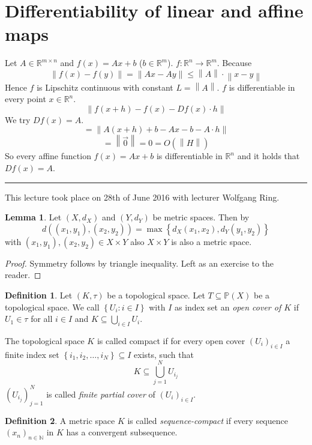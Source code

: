 \documentclass[a4paper,landscape,twocolumn]{article}
\theoremstyle{definition}
\newtheorem{defi}{Definition}
\newtheorem{lemma}{Lemma}
\newcommand\set[1]{\left\{#1\right\}}
\newcommand\meta[3]{\hrule{} This #1 took place on #2 with lecturer #3.\par}
\newcommand\norm[1]{\left\|#1\right\|}
\begin{document}
\section{Differentiability of linear and affine maps}
%
Let $A \in \mathbb R^{m\times n}$ and $f(x) = Ax + b$ ($b \in \mathbb R^m$).
$f: \mathbb R^n \to \mathbb R^m$. Because
\[ \norm{f(x) - f(y)} = \norm{Ax - Ay} \leq \norm{A} \cdot \norm{x - y} \]
Hence $f$ is Lipschitz continuous with constant $L = \norm{A}$.
$f$ is differentiable in every point $x \in \mathbb R^n$.
\[ \norm{f(x+h) - f(x) - Df(x) \cdot h} \]
We try $Df(x) = A$.
\[ = \norm{A (x + h) + b - Ax - b - A \cdot h} \]
\[ = \norm{\vec{0}} = 0 = O(\norm{H}) \]
So every affine function $f(x) = Ax + b$ is differentiable in $\mathbb R^n$
and it holds that $Df(x) = A$.

\meta{lecture}{28th of June 2016}{Wolfgang Ring}
\begin{lemma}
  Let $(X, d_X)$ and $(Y, d_Y)$ be metric spaces. Then by
  \[ d((x_1, y_1), (x_2, y_2)) = \max\set{d_X(x_1, x_2), d_Y(y_1, y_2)} \]
  with $(x_1, y_1), (x_2, y_2) \in X \times Y$ also $X \times Y$ is also
  a metric space.
\end{lemma}
\begin{proof}
  Symmetry follows by triangle inequality.
  Left as an exercise to the reader.
\end{proof}

\begin{defi}
  Let $(K, \tau)$ be a topological space.
  Let $T \subseteq \mathbb{P}(X)$ be a topological space.
  We call $\set{U_i: i \in I}$ with $I$ as index set
  an \emph{open cover of $K$} if $U_1 \in \tau$ for all $i \in I$
  and $K \subseteq \bigcup_{i \in I} U_i$.

  The topological space $K$ is called compact if for every
  open cover $(U_i)_{i \in I}$ a finite index set
  $\set{i_1, i_2, \ldots, i_N} \subseteq I$ exists, such that
  \[ K \subseteq \bigcup_{j=1}^N U_{i_j} \]
  $(U_{i_j})_{j=1}^N$ is called \emph{finite partial cover} of $(U_i)_{i \in I}$.
\end{defi}

\begin{defi}
  A metric space $K$ is called \emph{sequence-compact}
  if every sequence $(x_n)_{n \in \mathbb N}$ in $K$ has a convergent subsequence.
\end{defi}
\end{document}
